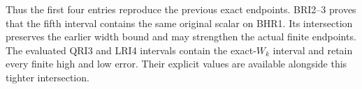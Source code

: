 Thus the first four entries reproduce the previous exact
endpoints. BRI2--3 proves that the fifth interval contains the
same original scalar on BHR1. Its intersection preserves the
earlier width bound and may strengthen the actual finite endpoints.
The evaluated QRI3 and LRI4 intervals contain the exact-$W_k$
interval and retain every finite high and low error. Their explicit
values are available alongside this tighter intersection.